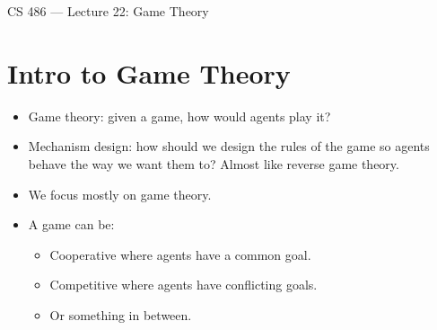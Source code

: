 \documentclass{article}
\author{Clement Tsang}
\begin{document}
\begin{center}
    \Large{CS 486 --- Lecture 22: Game Theory}
\end{center}

\section{Intro to Game Theory}
\begin{itemize}
    \item Game theory: given a game, how would agents play it?
    \item Mechanism design: how should we design the rules of the game so agents behave the way we want them to?  Almost like reverse game theory.
    \item We focus mostly on game theory.
    \item A game can be:
        \begin{itemize}
            \item Cooperative where agents have a common goal.
            \item Competitive where agents have conflicting goals.
            \item Or something in between.
        \end{itemize}
\end{itemize}
\end{document}
